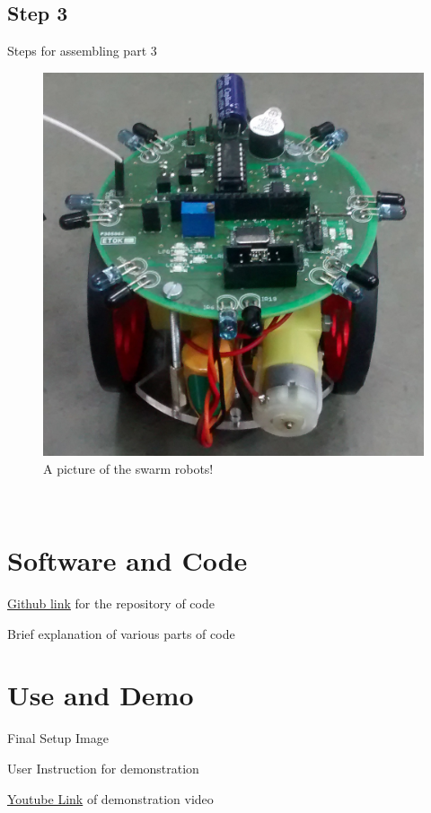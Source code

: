 \documentclass[a4paper,12pt,oneside]{book}
\begin{document}
\subsection*{Step 3}
Steps for assembling part 3
\hfill\\
\begin{figure}[h!]
	\caption{A picture of the swarm robots!}
	\includegraphics[width=\textwidth]{./Pictures/version2_top}		
\end{figure}	
\hfill\\

\section{Software and Code}
\href{https://github.com/eYSIP-2017/eYSIP-2017_DistributedRobotics.git}{Github link} for the repository of code

Brief explanation of various parts of code 

\section{Use and Demo}
Final Setup Image

User Instruction for demonstration

\href{http://www.youtube.com}{Youtube Link} of demonstration video 
\end{document}
